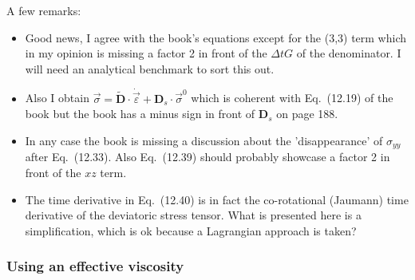 A few remarks:
\begin{itemize}
\item 
Good news, I agree with the book's equations except for the (3,3)
term which in my opinion is missing a factor 2 in front of 
the $\Delta t G$ of the denominator.
I will need an analytical benchmark to sort this out.
\item 
Also I obtain  $\vec\sigma= \tilde{\bm D} \cdot \dot{\vec{\varepsilon}} + {\bm D}_s \cdot \vec{\sigma}^0$ which is coherent with Eq.~(12.19) of the book but the book has a minus sign in front of ${\bm D}_s$ on page 188.
\item 
In any case the book is missing a discussion about the 'disappearance' of $\sigma_{yy}$ after Eq.~(12.33).
Also Eq.~(12.39) should probably showcase a factor 2 in front of
the $xz$ term.
\item The time derivative in Eq.~(12.40) is in fact the  co-rotational (Jaumann) time derivative of the deviatoric stress tensor. What is presented here is a simplification, which is ok because a Lagrangian approach is taken?
\end{itemize}

\subsubsection*{Using an effective viscosity}

